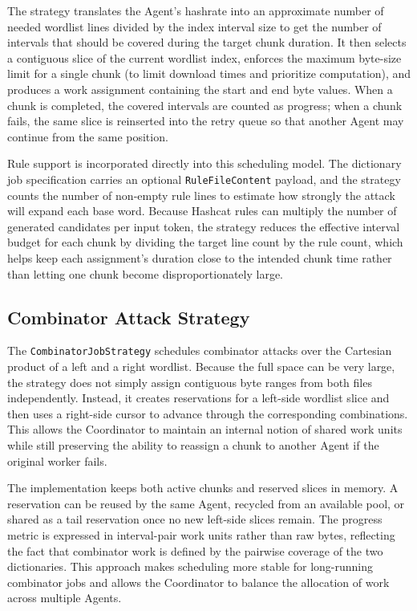 The strategy translates the Agent's hashrate into an approximate number of needed wordlist lines divided by the index interval size to get the number of intervals that should be covered during the target chunk duration. It then selects a contiguous slice of the current wordlist index, enforces the maximum byte-size limit for a single chunk (to limit download times and prioritize computation), and produces a work assignment containing the start and end byte values. When a chunk is completed, the covered intervals are counted as progress; when a chunk fails, the same slice is reinserted into the retry queue so that another Agent may continue from the same position.

Rule support is incorporated directly into this scheduling model. The dictionary job specification carries an optional \verb|RuleFileContent| payload, and the strategy counts the number of non-empty rule lines to estimate how strongly the attack will expand each base word. Because Hashcat rules can multiply the number of generated candidates per input token, the strategy reduces the effective interval budget for each chunk by dividing the target line count by the rule count, which helps keep each assignment's duration close to the intended chunk time rather than letting one chunk become disproportionately large.

\subsection{Combinator Attack Strategy}

The \verb|CombinatorJobStrategy| schedules combinator attacks over the Cartesian product of a left and a right wordlist. Because the full space can be very large, the strategy does not simply assign contiguous byte ranges from both files independently. Instead, it creates reservations for a left-side wordlist slice and then uses a right-side cursor to advance through the corresponding combinations. This allows the Coordinator to maintain an internal notion of shared work units while still preserving the ability to reassign a chunk to another Agent if the original worker fails.

The implementation keeps both active chunks and reserved slices in memory. A reservation can be reused by the same Agent, recycled from an available pool, or shared as a tail reservation once no new left-side slices remain. The progress metric is expressed in interval-pair work units rather than raw bytes, reflecting the fact that combinator work is defined by the pairwise coverage of the two dictionaries. This approach makes scheduling more stable for long-running combinator jobs and allows the Coordinator to balance the allocation of work across multiple Agents.

